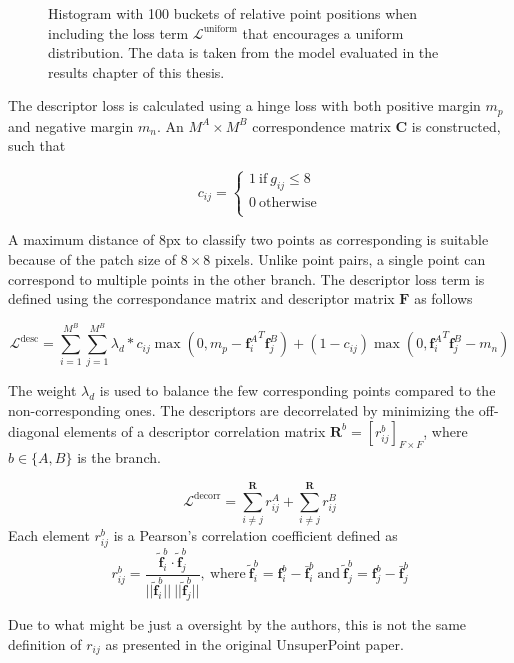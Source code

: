 \begin{figure}[H]
	\begin{center}
		
	\end{center}
	\caption{Histogram with 100 buckets of relative point positions when including the loss term $\mathcal{L}^{\textrm{uniform}}$ that encourages a uniform distribution. The data is taken from the model evaluated in the results chapter of this thesis.}
	\label{fig:hist-unixy}
\end{figure}

The descriptor loss is calculated using a hinge loss with both positive margin $m_p$ and negative margin $m_n$. An $M^A\times M^B$ correspondence matrix $\textbf{C}$ is constructed, such that

\begin{equation}
c_{ij}=
\begin{cases}
1\ \text{if}\ g_{ij}\le 8 \\
0\ \text{otherwise} \\
\end{cases}
\end{equation}

A maximum distance of 8px to classify two points as corresponding is suitable because of the patch size of $8\times 8$ pixels. Unlike point pairs, a single point can correspond to multiple points in the other branch. The descriptor loss term is defined using the correspondance matrix and descriptor matrix $\textbf{F}$ as follows

\begin{equation}
\mathcal{L}^{\textrm{desc}}=\sum^{M^B}_{i=1}\sum^{M^B}_{j=1}\lambda_d*c_{ij}\max\left(0,m_p-{\textbf{f}_i^A}^T\textbf{f}_j^B\right)+(1-c_{ij})\max\left(0,{\textbf{f}_i^A}^T\textbf{f}_j^B-m_n\right)
\end{equation}

The weight $\lambda_d$ is used to balance the few corresponding points compared to the non-corresponding ones. The descriptors are decorrelated by minimizing the off-diagonal elements of a descriptor correlation matrix $\textbf{R}^b=[r^b_{ij}]_{F\times F}$, where $b\in\{A,B\}$ is the branch.

\begin{equation}
\mathcal{L}^{\textrm{decorr}}=\sum^{\textbf{R}}_{i\neq j}r_{ij}^A+\sum^{\textbf{R}}_{i\neq j}r_{ij}^B
\end{equation}
Each element $r^b_{ij}$ is a Pearson's correlation coefficient\cite{pearsons} defined as
\begin{equation}
r^b_{ij}=
\frac{ \tilde{\textbf{f}}_i^b \cdot \tilde{\textbf{f}}_j^b }{
||\tilde{\textbf{f}}_i^b||\ ||\tilde{\textbf{f}}_j^b||
}
,\ \text{where}\ 
\tilde{\textbf{f}}_i^b=\textbf{f}_i^b-\bar{\textbf{f}}^b_i
\ \text{and}\ 
\tilde{\textbf{f}}_j^b=\textbf{f}_j^b-\bar{\textbf{f}}^b_j
\end{equation}

Due to what might be just a oversight by the authors, this is not the same definition of $r_{ij}$ as presented in the original UnsuperPoint paper.